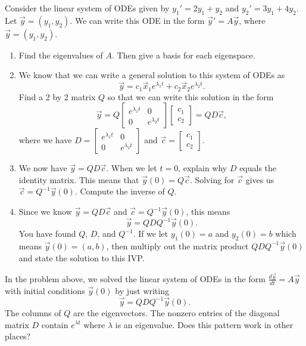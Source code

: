 \begin{problem}
 Consider the linear system of ODEs given by $y_1'=2y_1+y_2$ and $y_2'=3y_1+4y_2$. Let $\vec y = (y_1,y_2)$. We can write this ODE in the form $\vec y' = A\vec y$, where $\vec y = (y_1,y_2)$.  
 \begin{enumerate}
  \item Find the eigenvalues of $A$.  Then give a basis for each eigenspace.
  \item We know that we can write a general solution to this system of ODEs as 
$$
\vec y=
c_1\vec x_1 e^{\lambda_1 t }+c_2\vec x_2 e^{\lambda_2 t}.
$$
Find a 2 by 2 matrix $Q$ so that we can write this solution in the form 
$$
\vec y=
Q\begin{bmatrix}
 e^{\lambda_1 t} & 0\\
 0 & e^{\lambda_2 t}
\end{bmatrix}
\begin{bmatrix}
c_1\\c_2 
\end{bmatrix}
=QD\vec c,
$$
where we have $D=
\begin{bmatrix}
 e^{\lambda_1 t} & 0\\
 0 & e^{\lambda_2 t}
\end{bmatrix}$ 
and  
$\vec c =
\begin{bmatrix}
c_1\\c_2 
\end{bmatrix}
$.
\item We now have $\vec y = QD\vec c$. When we let $t=0$, explain why $D$ equals the identity matrix. This means that $\vec y(0) = Q\vec c$.  Solving for $\vec c$ gives us $\vec c= Q^{-1}\vec y(0)$.  Compute the inverse of $Q$.
 \item {}%
Since we know $\vec y = QD\vec c$ and $\vec c= Q^{-1}\vec y(0)$, this means 
$$\vec y = QDQ^{-1}\vec y(0).$$
You have found $Q$, $D$, and $Q^{-1}$. If we let $y_1(0)=a$ and $y_2(0)=b$ which means $\vec y(0)=(a,b)$, then multiply out the matrix product $QDQ^{-1}\vec y(0)$ and state the solution to this IVP.
\end{enumerate}

\end{problem}

In the problem above, we solved the linear system of ODEs in the form $\frac{d\vec y}{dt} = A\vec y$  with initial conditions $\vec y(0)$ by just writing
$$\vec y = QDQ^{-1}\vec y(0).$$
The columns of $Q$ are the eigenvectors. The nonzero entries of the diagonal matrix $D$ contain $e^{\lambda t}$ where $\lambda$ is an eigenvalue.  Does this pattern work in other places?

